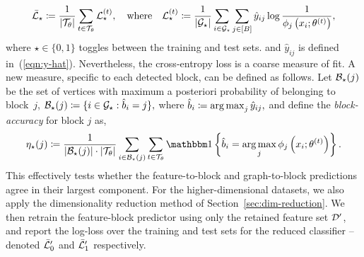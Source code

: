 %
\begin{equation}
	\bar{\mathcal{L}}_\star \coloneqq \frac{1}{|\mathcal{T}_\theta|} \sum_{t \in \mathcal{T}_\theta} \mathcal{L}_\star^{(t)},
	\quad \textrm{where} \quad
	\mathcal{L}_\star^{(t)} \coloneqq \frac{1}{|\mathcal{G}_\star|} \sum_{i \in \mathcal{G}_\star}\sum_{j \in [B]} \hat{y}_{ij} \log \frac{1}{\phi_j \left(x_i; \theta^{(t)} \right)},
	\label{eqn:cross-entropy-loss}
\end{equation}
%
where $\star \in \{0, 1\}$ toggles between the training and test sets.
and $\hat{y}_{ij}$ is defined in~(\ref{eqn:y-hat}).
%
Nevertheless, the cross-entropy loss is a coarse measure of fit. 
A new measure, specific to each detected block,
can be defined as follows. Let
$\mathcal{B}_\star(j)$ 
be the set of vertices with maximum a posteriori probability of belonging 
to block~$j$,
$
	\mathcal{B}_\star(j) \coloneqq \{i \in \mathcal{G}_\star : \hat{b}_i = j\},
$
where
$ 
	\hat{b}_i \coloneqq \operatorname*{arg\,max}_j \hat{y}_{ij},
$
and
define the {\em block-accuracy} for block $j$ as,
%
\begin{equation}
	\eta_\star(j) \coloneqq \frac{1}{|\Bcal_\star (j)| \cdot 
	|\Tcal_\theta| } 
	\sum_{i \in \Bcal_\star (j)}  \sum_{t \in \Tcal_\theta}
	\one \left\{\hat{b}_i = \argmax_j \phi_j \left( x_i; \theta^{(t)} \right) \right\}.
	\label{eqn:accuracy}
\end{equation}
%
This effectively tests whether the feature-to-block and 
graph-to-block predictions agree in their largest component.
For the higher-dimensional datasets, we also apply the 
dimensionality reduction method 
of Section~\ref{sec:dim-reduction}.  
We then retrain the feature-block predictor using only the retained 
feature set $\mathcal{D}'$, and report the log-loss over the training and 
test sets for the reduced classifier -- 
denoted $\bar{\mathcal{L}}_0'$ and $\bar{\mathcal{L}}_1'$ respectively. 



